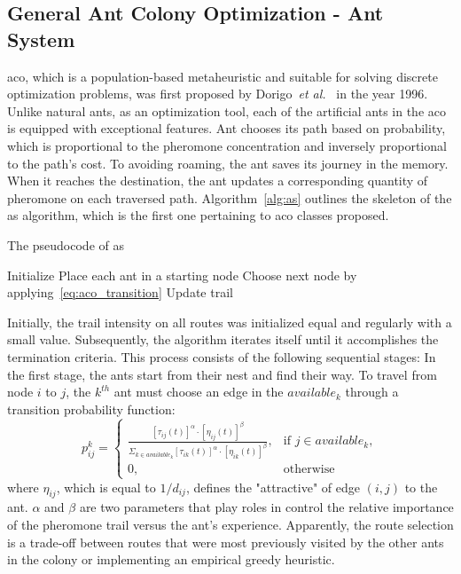 \subsection{General Ant Colony Optimization - Ant System}
\acrfull{aco}, which is a population-based metaheuristic and suitable for solving discrete optimization problems, was first proposed by Dorigo~\textit{et al.}~\cite{dorigo1996ant} in the year 1996. Unlike natural ants, as an optimization tool, each of the artificial ants in the \gls{aco} is equipped with exceptional features. Ant chooses its path based on probability, which is proportional to the pheromone concentration and inversely proportional to the path's cost. To avoiding roaming, the ant saves its journey in the memory. When it reaches the destination, the ant updates a corresponding quantity of pheromone on each traversed path. Algorithm~\ref{alg:as} outlines the skeleton of the \gls{as} algorithm, which is the first one pertaining to \gls{aco} classes proposed.
\bigskip
\begin{algorithm}
	\caption{The pseudocode of \gls{as}}
	\label{alg:as}
	\Begin
	{	
		Initialize 
		{
			Place each ant in a starting node\;
			{
				{
					Choose next node by applying~\ref{eq:aco_transition} \;
					Update trail\;
				}
			}
		}
	}
\end{algorithm}
\bigskip
Initially, the trail intensity on all routes was initialized equal and regularly with a small value. Subsequently, the algorithm iterates itself until it accomplishes the termination criteria. This process consists of the following sequential stages: In the first stage, the ants start from their nest and find their way. To travel from node $i$ to $j$, the $k^{th}$ ant must choose an edge in the $available_k$ through a transition probability function:
\begin{equation}
\label{eq:aco_transition}
p^k_{ij} =
\begin{cases}
	\frac{[\tau_{ij}(t)]^{\alpha} \cdot [\eta_{ij}(t)]^{\beta}} {\Sigma_{k \in available_k} [\tau_{ik}(t)]^{\alpha}\cdot [\eta_{ik}(t)]^{\beta}}, & \text{if $j \in available_k$}, \\
	0, & \text{otherwise}
\end{cases}
\end{equation}
where $\eta_{ij}$, which is equal to $1/d_{ij}$, defines the "attractive" of edge $(i,j)$ to the ant. $\alpha$ and $\beta$ are two parameters that play roles in control the relative importance of the pheromone trail versus the ant's experience. Apparently, the route selection is a trade-off between routes that were most previously visited by the other ants in the colony or implementing an empirical greedy heuristic. 

